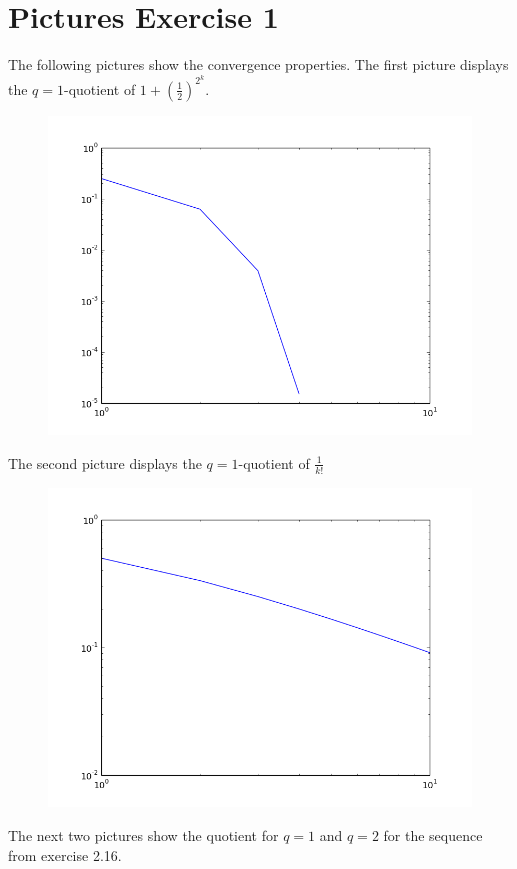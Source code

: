 \documentclass{article}
\begin{document}
\section{Pictures Exercise 1}
The following pictures show the convergence properties.
The first picture displays the $q=1$-quotient of $1+\left(\frac{1}{2}\right)^{2^k}$.
\begin{figure}[h!]
  \centering
  \includegraphics[scale=0.5]{f_1.png}
\end{figure}
The second picture displays the $q=1$-quotient of $\frac{1}{k!}$
\begin{figure}[h!]
  \centering
  \includegraphics[scale=0.5]{g_1.png}
\end{figure}
The next two pictures show the quotient for $q=1$ and $q=2$ for the sequence from exercise 2.16.
\end{document}
